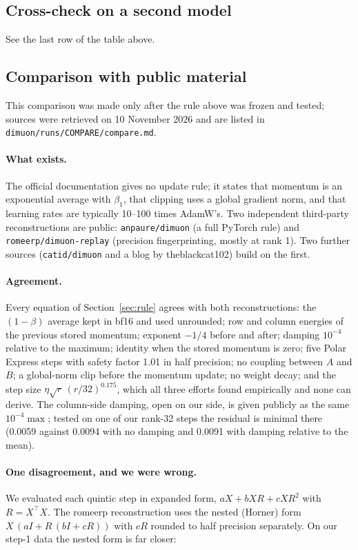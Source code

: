 \documentclass[11pt]{article}
\begin{document}
\subsection{Cross-check on a second model}
See the last row of the table above.
\subsection{Comparison with public material}\label{sec:compare}
This comparison was made only after the rule above was frozen and tested; sources were
retrieved on 10 November 2026 and are listed in \texttt{dimuon/runs/COMPARE/compare.md}.

\paragraph{What exists.} The official documentation gives no update rule; it states that
momentum is an exponential average with $\beta_1$, that clipping uses a global gradient norm,
and that learning rates are typically 10--100 times AdamW's. Two independent third-party
reconstructions are public: \texttt{anpaure/dimuon} (a full PyTorch rule) and
\texttt{romeerp/dimuon-replay} (precision fingerprinting, mostly at rank 1). Two further
sources (\texttt{catid/dimuon} and a blog by theblackcat102) build on the first.

\paragraph{Agreement.} Every equation of Section~\ref{sec:rule} agrees with both
reconstructions: the $(1-\beta)$ average kept in bf16 and used unrounded; row and column
energies of the previous stored momentum; exponent $-1/4$ before and after; damping
$10^{-4}$ relative to the maximum; identity when the stored momentum is zero; five Polar
Express steps with safety factor 1.01 in half precision; no coupling between $A$ and $B$; a
global-norm clip before the momentum update; no weight decay; and the step size
$\eta\sqrt r\,(r/32)^{0.175}$, which all three efforts found empirically and none can derive.
The column-side damping, open on our side, is given publicly as the same $10^{-4}\max$; tested
on one of our rank-32 steps the residual is minimal there (0.0059 against 0.0094 with no
damping and 0.0091 with damping relative to the mean).

\paragraph{One disagreement, and we were wrong.} We evaluated each quintic step in expanded
form, $aX+bXR+cXR^2$ with $R=X^\top X$. The romeerp reconstruction uses the nested (Horner)
form $X\,(aI+R\,(bI+cR))$ with $cR$ rounded to half precision separately. On our step-1 data
the nested form is far closer:
\end{document}
